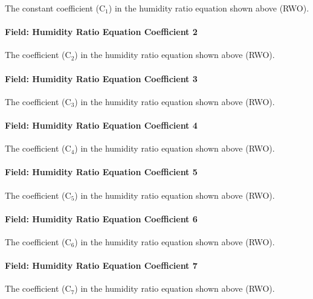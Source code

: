 The constant coefficient (C\(_{1}\)) in the humidity ratio equation shown above (RWO).

\paragraph{Field: Humidity Ratio Equation Coefficient 2}\label{field-humidity-ratio-equation-coefficient-2}

The coefficient (C\(_{2}\)) in the humidity ratio equation shown above (RWO).

\paragraph{Field: Humidity Ratio Equation Coefficient 3}\label{field-humidity-ratio-equation-coefficient-3}

The coefficient (C\(_{3}\)) in the humidity ratio equation shown above (RWO).

\paragraph{Field: Humidity Ratio Equation Coefficient 4}\label{field-humidity-ratio-equation-coefficient-4}

The coefficient (C\(_{4}\)) in the humidity ratio equation shown above (RWO).

\paragraph{Field: Humidity Ratio Equation Coefficient 5}\label{field-humidity-ratio-equation-coefficient-5}

The coefficient (C\(_{5}\)) in the humidity ratio equation shown above (RWO).

\paragraph{Field: Humidity Ratio Equation Coefficient 6}\label{field-humidity-ratio-equation-coefficient-6}

The coefficient (C\(_{6}\)) in the humidity ratio equation shown above (RWO).

\paragraph{Field: Humidity Ratio Equation Coefficient 7}\label{field-humidity-ratio-equation-coefficient-7}

The coefficient (C\(_{7}\)) in the humidity ratio equation shown above (RWO).

